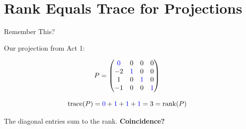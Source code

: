 \documentclass[10pt]{beamer}
\theoremstyle{definition}
\newcommand{\x}[1]{\alert{\textbf{#1}}}
\newcommand{\bl}[1]{{\color{blue}#1}}                 %
\begin{document}
%
\section{Rank Equals Trace for Projections}

\begin{frame}{Remember This?}

Our projection from Act 1:

$$P = \begin{pmatrix} \bl{0} & 0 & 0 & 0 \\ -2 & \bl{1} & 0 & 0 \\ 1 & 0 & \bl{1} & 0 \\ -1 & 0 & 0 & \bl{1} \end{pmatrix}$$

\vspace{0.3em}

$$\operatorname{trace}(P) = \bl{0} + \bl{1} + \bl{1} + \bl{1} = 3 = \operatorname{rank}(P)$$

\vspace{0.5em}

The diagonal entries sum to the rank. \quad \x{Coincidence?}

\end{frame}
\end{document}
